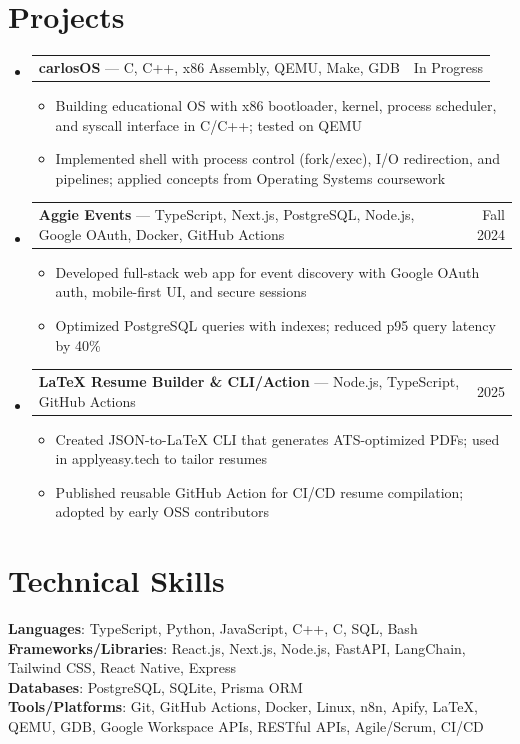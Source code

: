 \documentclass[letterpaper,11pt]{article}
\makeatletter
\newcommand{\resumeItem}[1]{
  \item\small{{#1 \vspace{-2pt}}}
}
\newcommand{\resumeProjectHeading}[2]{
    \item
    \begin{tabular*}{0.97\textwidth}{l@{\extracolsep{\fill}}r}
      \small#1 & #2 \\
    \end{tabular*}\vspace{-7pt}
}
\newcommand{\resumeSubHeadingListStart}{\begin{itemize}[leftmargin=0.15in, label={}]}
\newcommand{\resumeSubHeadingListEnd}{\end{itemize}}
\newcommand{\resumeItemListStart}{\begin{itemize}}
\newcommand{\resumeItemListEnd}{\end{itemize}\vspace{-5pt}}
\makeatother
\begin{document}
\section{Projects}
\resumeSubHeadingListStart
  \resumeProjectHeading
    {\textbf{carlosOS} — C, C++, x86 Assembly, QEMU, Make, GDB}{In Progress}
    \resumeItemListStart
      \resumeItem{Building educational OS with x86 bootloader, kernel, process scheduler, and syscall interface in C/C++; tested on QEMU}
      \resumeItem{Implemented shell with process control (fork/exec), I/O redirection, and pipelines; applied concepts from Operating Systems coursework}
    \resumeItemListEnd

  \resumeProjectHeading
    {\textbf{Aggie Events} — TypeScript, Next.js, PostgreSQL, Node.js, Google OAuth, Docker, GitHub Actions}{Fall 2024}
    \resumeItemListStart
      \resumeItem{Developed full-stack web app for event discovery with Google OAuth auth, mobile-first UI, and secure sessions}
      \resumeItem{Optimized PostgreSQL queries with indexes; reduced p95 query latency by 40\%}
    \resumeItemListEnd

  \resumeProjectHeading
    {\textbf{LaTeX Resume Builder \& CLI/Action} — Node.js, TypeScript, GitHub Actions}{2025}
    \resumeItemListStart
      \resumeItem{Created JSON-to-LaTeX CLI that generates ATS-optimized PDFs; used in applyeasy.tech to tailor resumes}
      \resumeItem{Published reusable GitHub Action for CI/CD resume compilation; adopted by early OSS contributors}
    \resumeItemListEnd
\resumeSubHeadingListEnd

\section{Technical Skills}
\begin{itemize}[leftmargin=0.15in, label={}]
  \small{\item{
    \textbf{Languages}{: TypeScript, Python, JavaScript, C++, C, SQL, Bash} \\
    \textbf{Frameworks/Libraries}{: React.js, Next.js, Node.js, FastAPI, LangChain, Tailwind CSS, React Native, Express} \\
    \textbf{Databases}{: PostgreSQL, SQLite, Prisma ORM} \\
    \textbf{Tools/Platforms}{: Git, GitHub Actions, Docker, Linux, n8n, Apify, LaTeX, QEMU, GDB, Google Workspace APIs, RESTful APIs, Agile/Scrum, CI/CD}
  }}
\end{itemize}
\end{document}
